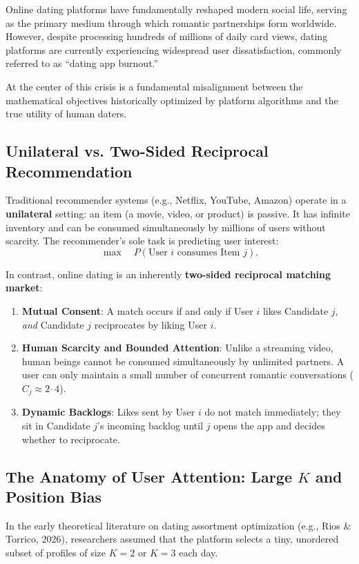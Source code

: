 \documentclass[11pt,letterpaper]{article}
\theoremstyle{definition}
\theoremstyle{plain}
\theoremstyle{remark}
\begin{document}
Online dating platforms have fundamentally reshaped modern social life, serving as the primary medium through which romantic partnerships form worldwide. However, despite processing hundreds of millions of daily card views, dating platforms are currently experiencing widespread user dissatisfaction, commonly referred to as ``dating app burnout.'' 

At the center of this crisis is a fundamental misalignment between the mathematical objectives historically optimized by platform algorithms and the true utility of human daters.

\subsection{Unilateral vs. Two-Sided Reciprocal Recommendation}
Traditional recommender systems (e.g., Netflix, YouTube, Amazon) operate in a \textbf{unilateral} setting: an item (a movie, video, or product) is passive. It has infinite inventory and can be consumed simultaneously by millions of users without scarcity. The recommender's sole task is predicting user interest:
\[
    \max \quad P(\text{User } i \text{ consumes Item } j).
\]

In contrast, online dating is an inherently \textbf{two-sided reciprocal matching market}:
\begin{enumerate}[leftmargin=2em]
    \item \textbf{Mutual Consent}: A match occurs if and only if User $i$ likes Candidate $j$, \emph{and} Candidate $j$ reciprocates by liking User $i$.
    \item \textbf{Human Scarcity and Bounded Attention}: Unlike a streaming video, human beings cannot be consumed simultaneously by unlimited partners. A user can only maintain a small number of concurrent romantic conversations ($C_j \approx 2\text{--}4$).
    \item \textbf{Dynamic Backlogs}: Likes sent by User $i$ do not match immediately; they sit in Candidate $j$'s incoming backlog until $j$ opens the app and decides whether to reciprocate.
\end{enumerate}

\subsection{The Anatomy of User Attention: Large $K$ and Position Bias}
In the early theoretical literature on dating assortment optimization (e.g., Rios \& Torrico, 2026), researchers assumed that the platform selects a tiny, unordered subset of profiles of size $K=2$ or $K=3$ each day. 
\end{document}
